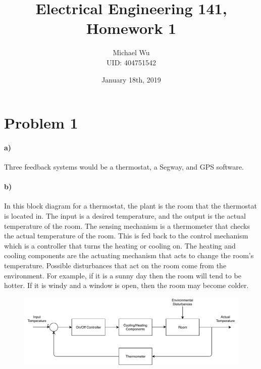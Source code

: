 \documentclass[12pt]{article}
\begin{document}
\title{Electrical Engineering 141, Homework 1}
\date{January 18th, 2019}
\author{Michael Wu\\UID: 404751542}
\maketitle

\section*{Problem 1}

\paragraph{a)}

Three feedback systems would be a thermostat, a Segway, and GPS software.

\paragraph{b)}

In this block diagram for a thermostat, the plant is the room that the thermostat is located in.
The input is a desired temperature, and the output is the actual temperature of the room. The sensing
mechanism is a thermometer that checks the actual temperature of the room. This is fed back to the control
mechanism which is a controller that turns the heating or cooling on. The heating and cooling components are
the actuating mechanism that acts to change the room's temperature. Possible disturbances that act on the
room come from the environment. For example, if it is a sunny day then the room will tend to be hotter. If it
is windy and a window is open, then the room may become colder.
\begin{figure}[H]
    \begin{center}
        \includegraphics[width=5.3in]{Thermostat.pdf}
    \end{center}
\end{figure}
\end{document}
